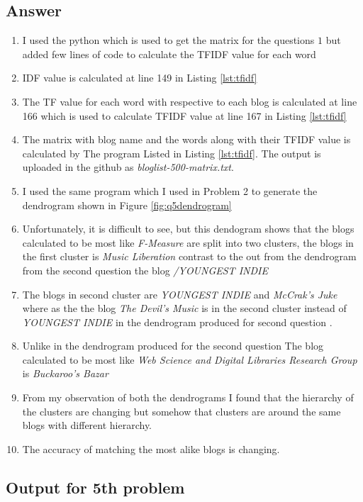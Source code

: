 \subsection{Answer}
\begin{enumerate}
\item I used the python which is used to get the matrix for the questions $1$ but added few lines of code to calculate the TFIDF value for each word
\item IDF value is calculated at line 149 in Listing \ref{lst:tfidf}  
\item The TF value for each word with respective to each blog is calculated at line 166 which is used to calculate TFIDF value at line 167 in Listing \ref{lst:tfidf}
\item The matrix with blog name and the words along with their TFIDF value is calculated by The program Listed in Listing \ref{lst:tfidf}. The output is uploaded in the github as \emph{bloglist-500-matrix.txt}.
\item I used the same program which I used in Problem 2 to generate the dendrogram shown in Figure \ref{fig:q5dendrogram}

\item Unfortunately, it is difficult to see, but this dendogram shows that the blogs calculated to be most like \emph{F-Measure} are split into two clusters, the blogs in the first cluster is \emph{Music Liberation} contrast to the out from the dendrogram from the second question the blog \emph{/YOUNGEST INDIE}
\item The blogs in second cluster are \emph{YOUNGEST INDIE} and \emph{McCrak's Juke} where as the the blog \emph{The Devil's Music} is in the second cluster instead of \emph{YOUNGEST INDIE} in the dendrogram produced for second question .

\item Unlike in the dendrogram produced for the second question The blog calculated to be most like \emph{Web Science and Digital Libraries Research Group} is \emph{Buckaroo's Bazar}

\item From my observation of both the dendrograms I found that the hierarchy of the clusters are changing but somehow that clusters are around the same blogs with different hierarchy. 
\item The accuracy of matching the most alike blogs is changing.
\end{enumerate}

\subsection{Output for 5th problem}

